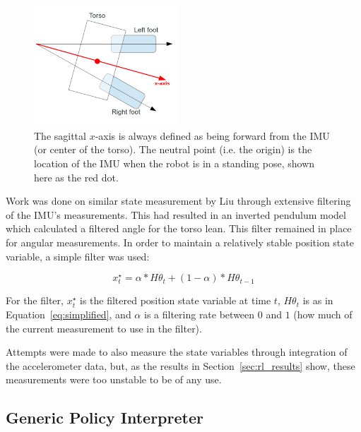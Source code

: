 \begin{figure}[h]
  \vspace{-10pt}
  \begin{center}
    \includegraphics[width=0.48\textwidth]{img/sagittal_feet.png}
  \end{center}
  \vspace{-30pt}
  \caption{The sagittal $x$-axis is always defined as being forward from the IMU (or center of the torso). The neutral point (i.e. the origin) is the location of the IMU when the robot is in a standing pose, shown here as the red dot.}
  \label{fig:sagittal}
\end{figure}

Work was done on similar state measurement by Liu\cite{liu} through extensive filtering of the IMU's measurements. This had resulted in an inverted pendulum model which calculated a filtered angle for the torso lean. This filter remained in place for angular measurements. In order to maintain a relatively stable position state variable, a simple filter was used:

\begin{equation}
x^\star_t = \alpha * H\theta_t + (1 - \alpha) * H\theta_{t-1}
\end{equation}

For the filter, $x^\star_t$ is the filtered position state variable at time $t$, $H\theta_t$ is as in Equation~\ref{eq:simplified}, and $\alpha$ is a filtering rate between $0$ and $1$ (how much of the current measurement to use in the filter).

Attempts were made to also measure the state variables through integration of the accelerometer data, but, as the results in Section~\ref{sec:rl_results} show, these measurements were too unstable to be of any use.

\subsection{Generic Policy Interpreter}

